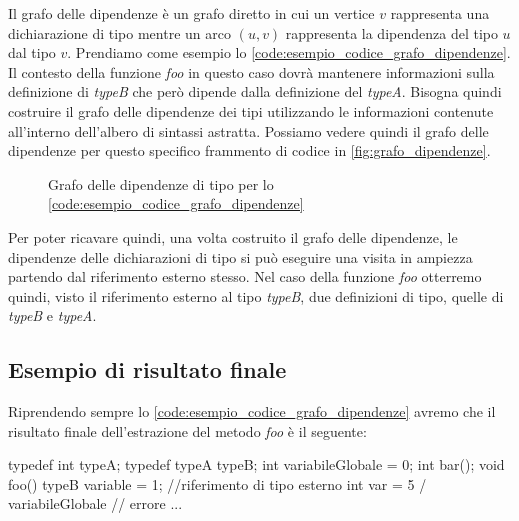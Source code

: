 Il grafo delle dipendenze è un grafo diretto in cui un vertice $v$ rappresenta una dichiarazione di tipo mentre un arco $(u,v)$ rappresenta la dipendenza del tipo $u$ dal tipo $v$.
Prendiamo come esempio lo \autoref{code:esempio_codice_grafo_dipendenze}. 
Il contesto della funzione \textit{foo} in questo caso dovrà mantenere informazioni sulla definizione di \textit{typeB} che però dipende dalla definizione del \textit{typeA}.
Bisogna quindi costruire il grafo delle dipendenze dei tipi utilizzando le informazioni contenute all'interno dell'albero di sintassi astratta.
Possiamo vedere quindi il grafo delle dipendenze per questo specifico frammento di codice in \autoref{fig:grafo_dipendenze}.


\begin{figure}[h]
  \centering
  \caption{Grafo delle dipendenze di tipo per lo \autoref{code:esempio_codice_grafo_dipendenze}}
  \label{fig:grafo_dipendenze}
\end{figure}

Per poter ricavare quindi, una volta costruito il grafo delle dipendenze, le dipendenze delle dichiarazioni di tipo si può eseguire una visita in ampiezza partendo dal riferimento esterno stesso.
Nel caso della funzione \textit{foo} otterremo quindi, visto il riferimento esterno al tipo \textit{typeB}, due definizioni di tipo, quelle di \textit{typeB} e \textit{typeA}.  

\subsection{Esempio di risultato finale}
Riprendendo sempre lo \autoref{code:esempio_codice_grafo_dipendenze} avremo che il risultato finale dell'estrazione del metodo \textit{foo} è il seguente:


\begin{code}[language=c++, caption={Esempio di estrazione del codice della funzione foo insieme al contesto}, label={code:esempio_finale}]

  typedef int typeA;
  typedef typeA typeB; 
  int variabileGlobale = 0;
  int bar();
  void foo(){
    typeB variable = 1; //riferimento di tipo esterno
    int var = 5 / variabileGlobale // errore
    ...
  }

\end{code}

